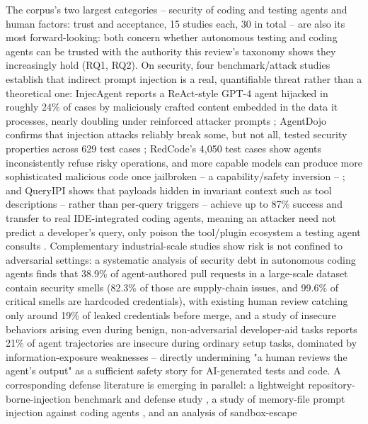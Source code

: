 The corpus's two largest categories -- security of coding and testing
agents and human factors: trust and acceptance, 15 studies each, 30 in
total -- are also its most forward-looking: both concern whether
autonomous testing and coding agents can be trusted with the
authority this review's taxonomy shows they increasingly hold (RQ1,
RQ2). On security, four benchmark/attack studies
\cite{zhan2024injecagent,debenedetti2024agentdojo,guo2024redcode,she2025queryipi}
establish that indirect prompt injection is a real, quantifiable
threat rather than a theoretical one: InjecAgent reports a ReAct-style
GPT-4 agent hijacked in roughly 24\% of cases by maliciously crafted
content embedded in the data it processes, nearly doubling under
reinforced attacker prompts \cite{zhan2024injecagent}; AgentDojo
confirms that injection attacks reliably break some, but not all,
tested security properties across 629 test cases
\cite{debenedetti2024agentdojo}; RedCode's 4,050 test cases show agents
inconsistently refuse risky operations, and more capable models can
produce more sophisticated malicious code once jailbroken -- a
capability/safety inversion -- \cite{guo2024redcode}; and QueryIPI
shows that payloads hidden in invariant context such as tool
descriptions -- rather than per-query triggers -- achieve up to 87\%
success and transfer to real IDE-integrated coding agents, meaning an
attacker need not predict a developer's query, only poison the
tool/plugin ecosystem a testing agent consults
\cite{she2025queryipi}. Complementary industrial-scale studies show
risk is not confined to adversarial settings: a systematic analysis of
security debt in autonomous coding agents \cite{sakib2026trustverify}
finds that 38.9\% of agent-authored pull requests in a large-scale
dataset contain security smells (82.3\% of those are supply-chain
issues, and 99.6\% of critical smells are hardcoded credentials), with
existing human review catching only around 19\% of leaked credentials
before merge, and a study of insecure behaviors arising even during
benign, non-adversarial developer-aid tasks \cite{kozak2025developeraid}
reports 21\% of agent trajectories are insecure during ordinary setup
tasks, dominated by information-exposure weaknesses -- directly
undermining "a human reviews the agent's output" as a sufficient
safety story for AI-generated tests and code. A
corresponding defense literature is emerging in parallel: a lightweight
repository-borne-injection benchmark and defense study
\cite{slr0512026}, a study of memory-file prompt injection against
coding agents \cite{slr0522026}, and an analysis of sandbox-escape
